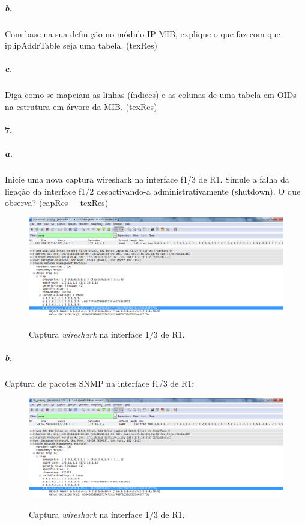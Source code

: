 \subparagraph{b.}
Com base na sua definição no módulo IP-MIB, explique o que faz com que ip.ipAddrTable seja uma tabela. (texRes)


\subparagraph{c.}
Diga como se mapeiam as linhas (índices) e as colunas de uma tabela em OIDs na estrutura em árvore da MIB. (texRes)


\paragraph{7.}

\subparagraph{a.}
Inicie uma nova captura wireshark na interface f1/3 de R1. Simule a falha da ligação da interface f1/2 desactivando-a administrativamente (shutdown). O que observa? (capRes + texRes)

\begin{figure}[h]
\centering
\includegraphics[width=1\textwidth, height=0.33\textheight]{7a.png}
\label{fig:10-capturaWireshark}
\caption{Captura \emph{wireshark} na interface \textsf{1/3} de \textsf{R1}.}
\end{figure}


\subparagraph{b.}
Captura de pacotes SNMP na interface \textsf{f1/3} de \textsf{R1}:

\begin{figure}[h]
\centering
\includegraphics[width=1\textwidth, height=0.33\textheight]{7b.png}
\label{fig:11-capturaWireshark}
\caption{Captura \emph{wireshark} na interface \textsf{1/3} de \textsf{R1}.}
\end{figure}


